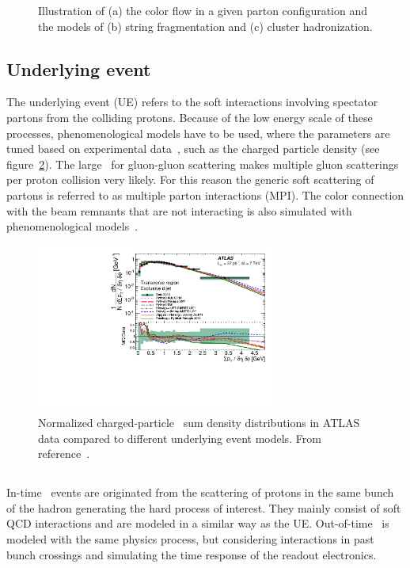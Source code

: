 \begin{figure}[!t]
\begin{center}
\begin{subfigure}{0.3\textwidth}
        \caption{}\end{subfigure}
  \end{center}
  \caption[Illustration of different hadronization models.]{Illustration of (a) the color flow in a given parton configuration and the models of (b) string fragmentation and (c) cluster hadronization.}
  \label{fig:HadronizationModels}
\end{figure}


\subsection{Underlying event}
The underlying event (UE) refers to the soft interactions involving spectator partons from the colliding protons. Because of the low energy scale of these processes, phenomenological models have to be used, where the parameters are tuned based on experimental data~\cite{Aad:2014hia}, such as the charged particle density (see figure~\ref{fig:UE}).
The large \xsec\ for gluon-gluon scattering makes multiple gluon scatterings per proton collision very likely. For this reason the generic soft scattering of partons is referred to as multiple parton interactions (MPI). The color connection with the beam remnants that are not interacting is also simulated with phenomenological models~\cite{Sjostrand:2006za,jimmy}.

\begin{figure}[!ht]
  \begin{center}
        \includegraphics[width=0.7\textwidth]{MCsimulation/Figures/figaux_04b}
  \end{center}
  \caption{Normalized charged-particle \pt\ sum density distributions in ATLAS data compared to different underlying event models. From reference~\cite{Aad:2014hia}.}
  \label{fig:UE}
\end{figure}
\subsection{\Pileup}
In-time \pileup\ events are originated from the scattering of protons in the same bunch of the hadron generating the hard process of interest. They mainly consist of soft QCD interactions and are modeled in a similar way as the UE. Out-of-time \pileup\ is modeled with the same physics process, but considering interactions in past bunch crossings and simulating the time response of the readout electronics.

